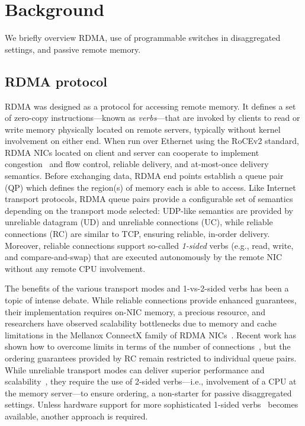 \section{Background}

We briefly overview RDMA, use of
programmable switches in disaggregated settings, and passive remote
memory.

\subsection{RDMA protocol}

RDMA was designed as a protocol for accessing remote memory. It
defines a set of zero-copy instructions---known as
\textit{verbs}---that are invoked by clients to read or write memory
physically located on remote servers, typically without kernel
involvement on either end.  When run over Ethernet using the RoCEv2
standard, RDMA NICs located on client and server can cooperate to
implement congestion~\cite{hpcc,dcqcn} and flow control, reliable
delivery, and at-most-once delivery semantics.  Before exchanging
data, RDMA end points establish a queue pair (QP) which defines the
region(s) of memory each is able to access.  Like Internet transport
protocols, RDMA queue pairs provide a configurable set of semantics
depending on the transport mode selected: UDP-like semantics are
provided by unreliable datagram (UD) and unreliable connections (UC),
while reliable connections (RC) are similar to TCP, ensuring reliable,
in-order delivery.  Moreover, reliable connections support so-called
\emph{1-sided} verbs (e.g., read, write, and compare-and-swap) that
are executed autonomously by the remote NIC without any remote CPU
involvement.

The benefits of the various transport modes and
1-vs-2-sided verbs has been a topic of intense debate.  While reliable
connections provide enhanced guarantees, their implementation requires
on-NIC memory, a precious resource, and researchers have observed
scalability bottlenecks due to memory and cache limitations in the
Mellanox ConnectX family of RDMA
NICs~\cite{farm,fasst,erpc,lite,design-guidelines}.  Recent work has
shown how to overcome limits in terms of the number of
connections~\cite{storm,flock}, but the ordering guarantees provided
by RC remain restricted to individual queue pairs.  While unreliable
transport modes can deliver superior performance and
scalability~\cite{fasst}, they require the use of 2-sided
verbs---i.e., involvement of a CPU at the memory server---to ensure
ordering, a non-starter for passive disaggregated settings.  Unless
hardware support for more sophisticated 1-sided verbs~\cite{filemr,rma,star}
becomes available, another approach is required.


